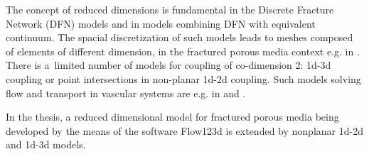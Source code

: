 The concept of reduced dimensions is fundamental in the Discrete Fracture Network (DFN) models \cite{jing_fundamentals_dfn_2007}
and in models combining DFN with equivalent continuum. The spacial discretization of such models leads to
meshes composed of elements of different dimension, in the fractured porous media context e.g. in
\cite{martin_modeling_2005, fumagalli_numerical_2011, brezina_analysis_2015}.
There is a~limited number of models for coupling of co-dimension 2: 1d-3d coupling or point intersections in non-planar 1d-2d coupling.
Such models solving flow and transport in vascular systems are e.g. in \cite{dangelo_coupling_2008} and \cite{koppl_tum_2015}.

% 

In the thesis, a reduced dimensional model for fractured porous media being developed by the means of the software Flow123d
is extended by nonplanar 1d-2d and 1d-3d models.




